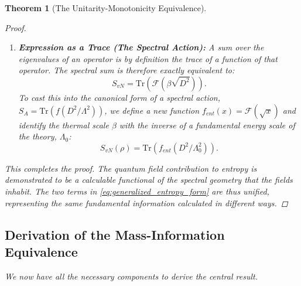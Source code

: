 \documentclass[11pt, letterpaper]{report}
\theoremstyle{plain} %
\newtheorem{theorem}{Theorem}[chapter]
\theoremstyle{definition} %
\theoremstyle{remark} %
\begin{document}
\begin{theorem}[The Unitarity-Monotonicity Equivalence]
\begin{proof}
\begin{enumerate}
    \item \textbf{Expression as a Trace (The Spectral Action):} A sum over the eigenvalues of an operator is by definition the trace of a function of that operator. The spectral sum is therefore exactly equivalent to:
    \begin{equation}
        S_{vN} = \text{Tr}\left( \mathcal{F}(\beta\sqrt{D^2}) \right).
    \end{equation}
    To cast this into the canonical form of a spectral action, $S_A = \text{Tr}(f(D^2/\Lambda^2))$, we define a new function $f_{ent}(x) = \mathcal{F}(\sqrt{x})$ and identify the thermal scale $\beta$ with the inverse of a fundamental energy scale of the theory, $\Lambda_0$:
    \begin{equation}
        S_{vN}(\rho) = \text{Tr}\left( f_{ent}(D^2 / \Lambda_0^2) \right).
        \label{eq:entropy_as_spectral_action_final}
    \end{equation}
\end{enumerate}
This completes the proof. The quantum field contribution to entropy is demonstrated to be a calculable functional of the spectral geometry that the fields inhabit. The two terms in \cref{eq:generalized_entropy_form} are thus unified, representing the same fundamental information calculated in different ways.
\end{proof}












\subsection{Derivation of the Mass-Information Equivalence}

We now have all the necessary components to derive the central result.


\end{theorem}
\end{document}
